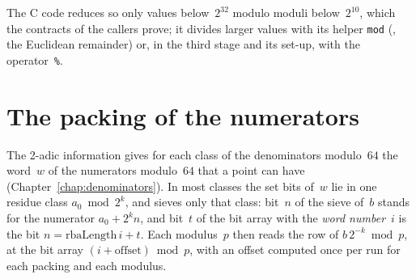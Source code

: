 The C code reduces so only values below~$2^{32}$ modulo moduli below~$2^{10}$, which the contracts
of the callers prove; it divides larger values with its helper \verb|mod|
(, the Euclidean remainder) or, in the third stage and its set-up,
with the operator~\verb|%|.

\section{The packing of the numerators}\label{sec:packing}

The 2-adic information gives for each class of the denominators modulo~$64$ the word~$w$ of the
numerators modulo~$64$ that a point can have (Chapter~\ref{chap:denominators}). In most classes the
set bits of~$w$ lie in one residue class $a_0 \bmod 2^k$, and \ratpoints{} sieves only that class:
bit~$n$ of the sieve of~$b$ stands for the numerator $a_0 + 2^k n$, and bit~$t$ of the bit array
with the \emph{word number}~$i$ is the bit $n = \mathrm{rbaLength}\, i + t$. Each modulus~$p$ then
reads the row of $b\, 2^{-k} \bmod p$, at the bit array $(i + \mathrm{offset}) \bmod p$, with an
offset computed once per run for each packing and each modulus.

